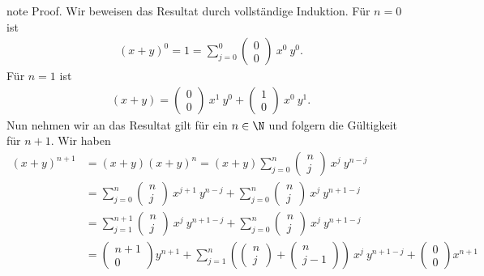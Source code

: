 \documentclass[letterpaper,10pt,english]{jupyterBook}
\begin{document}
\begin{sphinxadmonition}{note}
Proof.  Wir beweisen das Resultat durch vollständige Induktion. Für \(n=0\) ist
\begin{equation*}
\begin{split}(x+y)^0 = 1 =  \sum_{j=0}^0 (\begin{matrix} 0\\0 \end{matrix} ) ~  x^0~ y^0 .\end{split}
\end{equation*}
Für \(n=1\) ist
\begin{equation*}
\begin{split} (x+y) = (\begin{matrix} 0\\0 \end{matrix} ) ~  x^1~ y^0 + (\begin{matrix} 1\\0 \end{matrix} ) ~  x^0~ y^1.\end{split}
\end{equation*}
Nun nehmen wir an das Resultat gilt für ein \(n \in \N\) und folgern die Gültigkeit für \(n+1\).
Wir haben
\begin{align*}
(x+y)^{n+1} &= (x+y) (x+y)^n =  (x+y) \sum_{j=0}^n (\begin{matrix} n\\j \end{matrix} ) ~  x^j~ y^{n-j} \\
&=\sum_{j=0}^n (\begin{matrix} n\\j \end{matrix} ) ~  x^{j+1}~ y^{n-j} +\sum_{j=0}^n (\begin{matrix} n\\j \end{matrix} ) ~  x^j~ y^{n+1-j}  \\
&= \sum_{j=1}^{n+1} (\begin{matrix} n\\j \end{matrix} ) ~  x^{j}~ y^{n+1-j}  + \sum_{j=0}^n (\begin{matrix} n\\j \end{matrix} ) ~  x^j~ y^{n+1-j} \\
&= (\begin{matrix} n+1\\ 0 \end{matrix} ) y^{n+1}+ \sum_{j=1}^{n } \left( (\begin{matrix} n\\j \end{matrix} ) +  (\begin{matrix} n\\j-1 \end{matrix} ) \right) ~  x^{j}~ y^{n+1-j} + (\begin{matrix} 0\\ 0 \end{matrix} ) x^{n+1}

\end{align*}
\end{sphinxadmonition}
\end{document}
